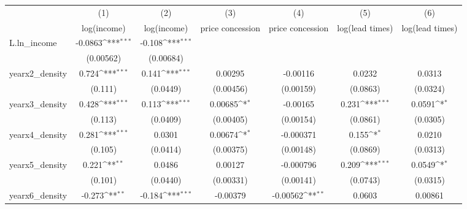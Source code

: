 {
\def\sym#1{\ifmmode^{#1}\else\(^{#1}\)\fi}
\begin{tabular}{l*{6}{c}}
\toprule
            &\multicolumn{1}{c}{(1)}&\multicolumn{1}{c}{(2)}&\multicolumn{1}{c}{(3)}&\multicolumn{1}{c}{(4)}&\multicolumn{1}{c}{(5)}&\multicolumn{1}{c}{(6)}\\
            &\multicolumn{1}{c}{log(income)}&\multicolumn{1}{c}{log(income)}&\multicolumn{1}{c}{price concession}&\multicolumn{1}{c}{price concession}&\multicolumn{1}{c}{log(lead times)}&\multicolumn{1}{c}{log(lead times)}\\
\midrule
L.ln\_income &     -0.0863\sym{***}&      -0.108\sym{***}&                     &                     &                     &                     \\
            &   (0.00562)         &   (0.00684)         &                     &                     &                     &                     \\
\addlinespace
yearx2\_density&       0.724\sym{***}&       0.141\sym{***}&     0.00295         &    -0.00116         &      0.0232         &      0.0313         \\
            &     (0.111)         &    (0.0449)         &   (0.00456)         &   (0.00159)         &    (0.0863)         &    (0.0324)         \\
\addlinespace
yearx3\_density&       0.428\sym{***}&       0.113\sym{***}&     0.00685\sym{*}  &    -0.00165         &       0.231\sym{***}&      0.0591\sym{*}  \\
            &     (0.113)         &    (0.0409)         &   (0.00405)         &   (0.00154)         &    (0.0861)         &    (0.0305)         \\
\addlinespace
yearx4\_density&       0.281\sym{***}&      0.0301         &     0.00674\sym{*}  &   -0.000371         &       0.155\sym{*}  &      0.0210         \\
            &     (0.105)         &    (0.0414)         &   (0.00375)         &   (0.00148)         &    (0.0869)         &    (0.0313)         \\
\addlinespace
yearx5\_density&       0.221\sym{**} &      0.0486         &     0.00127         &   -0.000796         &       0.209\sym{***}&      0.0549\sym{*}  \\
            &     (0.101)         &    (0.0440)         &   (0.00331)         &   (0.00141)         &    (0.0743)         &    (0.0315)         \\
\addlinespace
yearx6\_density&      -0.273\sym{**} &      -0.184\sym{***}&    -0.00379         &    -0.00562\sym{**} &      0.0603         &     0.00861         \\

\end{tabular}}
